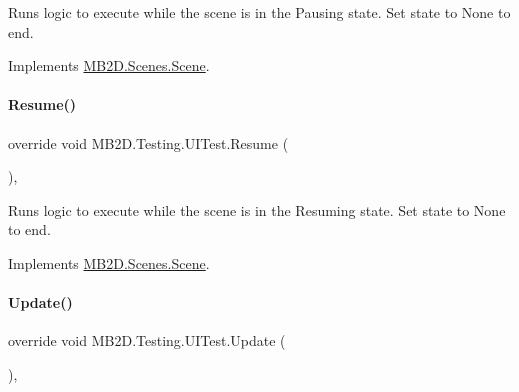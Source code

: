 Runs logic to execute while the scene is in the Pausing state. Set state to None to end. 



Implements \hyperlink{class_m_b2_d_1_1_scenes_1_1_scene_a0661eff0223150fa8e9ea88145409e5d}{M\+B2\+D.\+Scenes.\+Scene}.

\hypertarget{class_m_b2_d_1_1_testing_1_1_u_i_test_a933c2bf347db47bf2921709c10d78acc}{}\label{class_m_b2_d_1_1_testing_1_1_u_i_test_a933c2bf347db47bf2921709c10d78acc} 
\paragraph{\texorpdfstring{Resume()}{Resume()}}
{\footnotesize\ttfamily override void M\+B2\+D.\+Testing.\+U\+I\+Test.\+Resume (\begin{DoxyParamCaption}{ }\end{DoxyParamCaption})\hspace{0.3cm}{\ttfamily [inline]}, {\ttfamily [virtual]}}



Runs logic to execute while the scene is in the Resuming state. Set state to None to end. 



Implements \hyperlink{class_m_b2_d_1_1_scenes_1_1_scene_ad13639db22b059a1b714eefd9d927735}{M\+B2\+D.\+Scenes.\+Scene}.

\hypertarget{class_m_b2_d_1_1_testing_1_1_u_i_test_a547d5592fee47d4c9354ee8f307c8813}{}\label{class_m_b2_d_1_1_testing_1_1_u_i_test_a547d5592fee47d4c9354ee8f307c8813} 
\paragraph{\texorpdfstring{Update()}{Update()}}
{\footnotesize\ttfamily override void M\+B2\+D.\+Testing.\+U\+I\+Test.\+Update (\begin{DoxyParamCaption}{ }\end{DoxyParamCaption})\hspace{0.3cm}{\ttfamily [inline]}, {\ttfamily [virtual]}}



